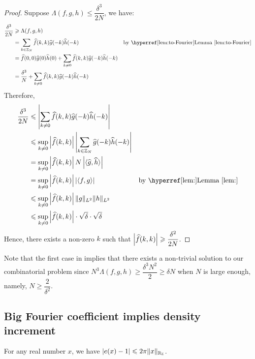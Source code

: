 \begin{proof}
	Suppose  $ \Lambda(f,g,h) \leq \dfrac{\delta^3}{2N}$, we have:
	\begin{align*}
		\dfrac{\delta^3}{2N} & \geq \Lambda(f,g,h) \\
		& = \sum\limits_{k \in \bbZ_N} \widehat{f}(k,k) \widehat{g}(-k) \widehat{h}(-k)  & \text{by \lemmaref{to-Fourier}} \\
		& = \widehat{f}(0,0) \widehat{g}(0) \widehat{h}(0) + \sum\limits_{k \neq 0} \widehat{f}(k,k) \widehat{g}(-k) \widehat{h}(-k) \\
		& = \dfrac{\delta^3}{N} + \sum\limits_{k \neq 0} \widehat{f}(k,k) \widehat{g}(-k) \widehat{h}(-k) \\
	\end{align*}
	Therefore, 
	\begin{align*}
		\dfrac{\delta^3}{2N} 
		& \leq \abs{\sum\limits_{k \neq 0} \widehat{f}(k,k) \widehat{g}(-k) \widehat{h}(-k)} \\
		& \leq \sup_{k \neq 0} \abs{\widehat{f}(k, k)}\abs{\sum\limits_{k \in \bbZ_N}  \widehat{g}(-k) \widehat{h}(-k)} \\
		& = \sup_{k \neq 0} \abs{\widehat{f}(k, k)} N \abs{\langle \widehat{g}, \widehat{h} \rangle} \\
		& = \sup_{k \neq 0} \abs{\widehat{f}(k, k)} \abs{\langle f, g \rangle}  & \text{by \lemmaref{}} \\
		& \leq \sup_{k \neq 0} \abs{\widehat{f}(k, k)} \| g \|_{L^2} \| h \|_{L^2} \\
		& \leq \sup_{k \neq 0} \abs{\widehat{f}(k, k)} \cdot \sqrt{\delta} \cdot \sqrt{\delta}  		
	\end{align*} 
Hence, there exists a non-zero $ k $ such that $ \left\vert{\widehat{f}(k, k)}\right\vert \geqslant \dfrac{\delta^2}{2N} $.
\end{proof}

\noindent Note that the first case in  implies that there exists a non-trivial solution to our combinatorial problem since $ N^3 \Lambda(f,g,h) \geq \dfrac{\delta^3 N^2}{2} \geq \delta N $ when $ N $ is large enough, namely, $ N \geq \dfrac{2}{\delta^2} $.

\subsection{Big Fourier coefficient implies density increment}
\begin{lemma} \label{lem:e-ineq}
	For any real number $ x $, we have $ \left\vert{e(x) - 1}\right\vert \leqslant 2 \pi \| x \|_{{\mathbb R}_{\mathbb Z}}  $.
\end{lemma}

